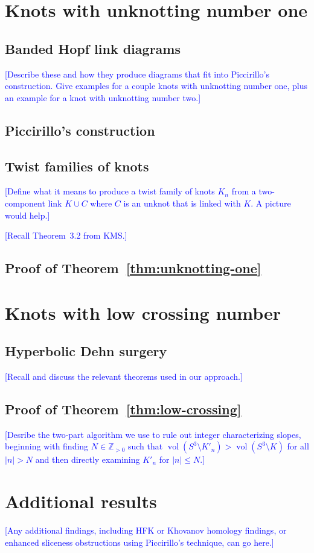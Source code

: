 \documentclass[11pt,usenames,dvipsnames,reqno]{amsart}
\newcommand{\zz}{\mathbb{Z}}
\newcommand{\vol}{\operatorname{vol}}
\numberwithin{theorem}{section}
\theoremstyle{ex}
\theoremstyle{rem}
\def\kh#1{\textcolor{Blue}{#1}}
\begin{document}
\section{Knots with unknotting number one}\label{sec:unknotting-one}


\subsection{Banded Hopf link diagrams} \kh{[Describe these and how they produce diagrams that fit into Piccirillo's construction. Give examples for a couple knots with unknotting number one, plus an example for a knot with unknotting number two.]}

\subsection{Piccirillo's construction}

\subsection{Twist families of knots}

\kh{[Define what it means to produce a twist family of knots $K_n$ from a two-component link $K\cup C$ where $C$ is an unknot that is linked with $K$. A picture would help.]}

\kh{[Recall Theorem~3.2 from KMS.]}

\subsection{Proof of Theorem~\ref{thm:unknotting-one}}

\section{Knots with low crossing number}


\subsection{Hyperbolic Dehn surgery} \kh{[Recall and discuss the relevant theorems used in our approach.]}

\subsection{Proof of Theorem~\ref{thm:low-crossing}}

\kh{[Desribe the two-part algorithm we use to rule out integer characterizing slopes, beginning with finding $N \in \zz_{>0}$ such that $\vol(S^3 \setminus K'_n)> \vol(S^3 \setminus K)$ for all $|n|>N$ and then directly examining $K'_n$ for $|n| \leq N$.]}

\section{Additional results}

\kh{[Any additional findings, including HFK or Khovanov homology findings, or enhanced sliceness obstructions using Piccirillo's technique, can go here.]}




\end{document}
